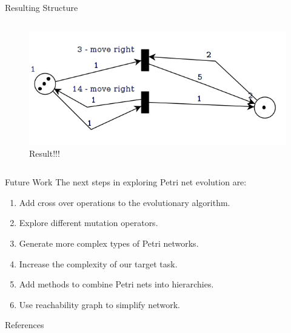 \documentclass[12pt]{beamer}
\begin{document}
\begin{frame}{Resulting Structure}
\begin{columns}[]
\begin{column}{2in}
 \begin{figure}
\includegraphics[scale=0.3]{PetriNet_1_4}
\caption{Result!!!}
\end{figure}
  \end{column}
\end{columns}

\end{frame}

\begin{frame}{Future Work}
The next steps in exploring Petri net evolution are:
\begin{enumerate}
\item Add cross over operations to the evolutionary algorithm.
\item Explore different mutation operators.
\item Generate more complex types of Petri networks.
\item Increase the complexity of our target task.
\item Add methods to combine Petri nets into hierarchies.
\item Use reachability graph to simplify network.
\end{enumerate}

\end{frame}

\begin{frame}{References}

\end{frame}
\end{document}
